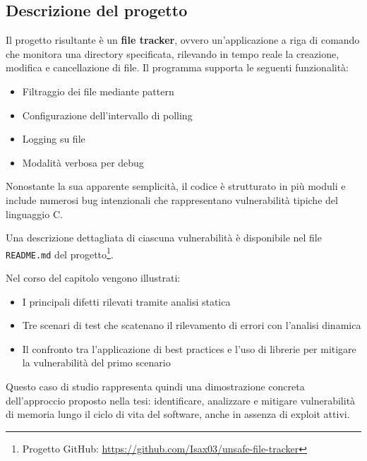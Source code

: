 \subsection*{Descrizione del progetto}

Il progetto risultante è un \textbf{file tracker}, ovvero un'applicazione a riga
di comando che monitora una directory specificata, rilevando in tempo reale la
creazione, modifica e cancellazione di file. Il programma supporta le seguenti
funzionalità:
\begin{itemize}
  \item Filtraggio dei file mediante pattern

  \item Configurazione dell'intervallo di polling

  \item Logging su file

  \item Modalità verbosa per debug
\end{itemize}

Nonostante la sua apparente semplicità, il codice è strutturato in più moduli e include
numerosi bug intenzionali che rappresentano vulnerabilità tipiche del linguaggio
C.

Una descrizione dettagliata di ciascuna vulnerabilità è disponibile nel file \texttt{README.md}
del progetto\footnote{Progetto GitHub: \url{https://github.com/Isax03/unsafe-file-tracker}}.

Nel corso del capitolo vengono illustrati:
\begin{itemize}
  \item I principali difetti rilevati tramite analisi statica

  \item Tre scenari di test che scatenano il rilevamento di errori con l'analisi
    dinamica

  \item Il confronto tra l'applicazione di best practices e l'uso di librerie per
    mitigare la vulnerabilità del primo scenario
\end{itemize}

Questo caso di studio rappresenta quindi una dimostrazione concreta dell'approccio
proposto nella tesi: identificare, analizzare e mitigare vulnerabilità di memoria
lungo il ciclo di vita del software, anche in assenza di exploit attivi.


